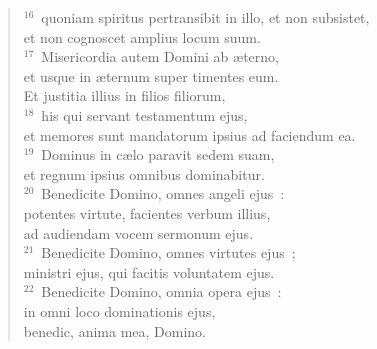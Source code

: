 \begin{flushleft}
\begin{verse}
${}^{16}$~quoniam spiritus pertransibit in illo, et non subsistet,\\ et non cognoscet amplius locum suum.\\
${}^{17}$~Misericordia autem Domini ab \ae terno,\\ et usque in \ae ternum super timentes eum.\\ Et justitia illius in filios filiorum,\\
${}^{18}$~his qui servant testamentum ejus,\\ et memores sunt mandatorum ipsius ad faciendum ea.\\
${}^{19}$~Dominus in c\ae lo paravit sedem suam,\\ et regnum ipsius omnibus dominabitur.\\
${}^{20}$~Benedicite Domino, omnes angeli ejus~:\\ potentes virtute, facientes verbum illius,\\ ad audiendam vocem sermonum ejus.\\
${}^{21}$~Benedicite Domino, omnes virtutes ejus~;\\ ministri ejus, qui facitis voluntatem ejus.\\
${}^{22}$~Benedicite Domino, omnia opera ejus~:\\ in omni loco dominationis ejus,\\ benedic, anima mea, Domino.\end{verse}\end{flushleft}



